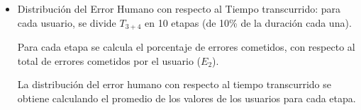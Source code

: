 \begin{itemize}
	\item Distribuci\'on del Error Humano con respecto al Tiempo transcurrido: para cada usuario, 
	se divide $T_{3+4}$ en 10 etapas (de 10\% de la duraci\'on cada una).

	Para cada etapa se calcula el porcentaje de errores cometidos, con respecto al total de
	errores cometidos por el usuario ($E_2$).

	La distribuci\'on del error humano con respecto al tiempo transcurrido se obtiene calculando 
	el promedio de los valores de los usuarios para cada etapa.
   
\end{itemize}
